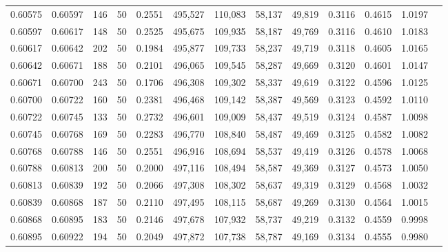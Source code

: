 \begin{tabular}{rrrrrrrrrrrrr}
0.60575 & 0.60597 &   146 &  50 &                                     0.2551 & 495,527 & 110,083 &  58,137 &  49,819 & 0.3116 & 0.4615 & 1.0197 \\
0.60597 & 0.60617 &   148 &  50 &                                     0.2525 & 495,675 & 109,935 &  58,187 &  49,769 & 0.3116 & 0.4610 & 1.0183 \\
0.60617 & 0.60642 &   202 &  50 &                                     0.1984 & 495,877 & 109,733 &  58,237 &  49,719 & 0.3118 & 0.4605 & 1.0165 \\
0.60642 & 0.60671 &   188 &  50 &                                     0.2101 & 496,065 & 109,545 &  58,287 &  49,669 & 0.3120 & 0.4601 & 1.0147 \\
0.60671 & 0.60700 &   243 &  50 &                                     0.1706 & 496,308 & 109,302 &  58,337 &  49,619 & 0.3122 & 0.4596 & 1.0125 \\
0.60700 & 0.60722 &   160 &  50 &                                     0.2381 & 496,468 & 109,142 &  58,387 &  49,569 & 0.3123 & 0.4592 & 1.0110 \\
0.60722 & 0.60745 &   133 &  50 &                                     0.2732 & 496,601 & 109,009 &  58,437 &  49,519 & 0.3124 & 0.4587 & 1.0098 \\
0.60745 & 0.60768 &   169 &  50 &                                     0.2283 & 496,770 & 108,840 &  58,487 &  49,469 & 0.3125 & 0.4582 & 1.0082 \\
0.60768 & 0.60788 &   146 &  50 &                                     0.2551 & 496,916 & 108,694 &  58,537 &  49,419 & 0.3126 & 0.4578 & 1.0068 \\
0.60788 & 0.60813 &   200 &  50 &                                     0.2000 & 497,116 & 108,494 &  58,587 &  49,369 & 0.3127 & 0.4573 & 1.0050 \\
0.60813 & 0.60839 &   192 &  50 &                                     0.2066 & 497,308 & 108,302 &  58,637 &  49,319 & 0.3129 & 0.4568 & 1.0032 \\
0.60839 & 0.60868 &   187 &  50 &                                     0.2110 & 497,495 & 108,115 &  58,687 &  49,269 & 0.3130 & 0.4564 & 1.0015 \\
0.60868 & 0.60895 &   183 &  50 &                                     0.2146 & 497,678 & 107,932 &  58,737 &  49,219 & 0.3132 & 0.4559 & 0.9998 \\
0.60895 & 0.60922 &   194 &  50 &                                     0.2049 & 497,872 & 107,738 &  58,787 &  49,169 & 0.3134 & 0.4555 & 0.9980 \\

\end{tabular}
